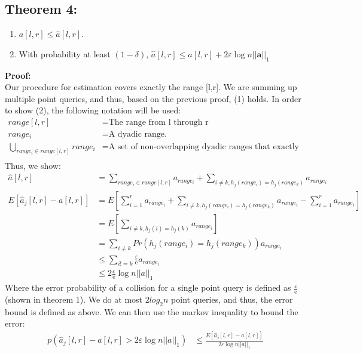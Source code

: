 \documentclass[11pt]{article}
\begin{document}
{\subsection{Theorem 4: }
\begin{enumerate}[label=\textnormal{(\arabic*)}]
    \item $a[l,r] \leq \hat a[l,r]$.\\
    \item With probability at least $(1-\delta)$, $\hat a[l,r] \leq a[l,r] + 2\varepsilon \log n ||\bm{a}||_1$
\end{enumerate}
    \textbf{Proof:}\\
Our procedure for estimation covers exactly the range [l,r]. We are summing up multiple point queries, and thus, based on the previous proof, (1) holds. In order to show (2), the following notation will be used:
\begin{align*}
    range[l,r] &= \text{The range from l through r}\\
    range_i &= \text{A dyadic range.}\\
    \bigcup_{range_i \in range[l,r]} range_i &= \text{A set of non-overlapping dyadic ranges that exactly cover range[l,r]}\\
\end{align*}
Thus, we show:
\begin{align*}
    \hat a[l,r] &= \sum_{range_i \in range[l,r]} a_{range_i} + \sum_{i \neq k, h_j(range_i) = h_j(range_k)} a_{range_i}\\
    E[\hat a_j[l,r] - a[l,r]] &= E[\sum_{i=1}^r a_{range_i} + \sum_{i \neq k, h_j(range_i)=h_j(range_k)} a_{range_i} - \sum_{i=1}^r a_{range_i}]\\
    &= E[\sum_{i \neq k, h_j(i)=h_j(k)} a_{range_i}]\\
    &= \sum_{i \neq k}Pr(h_j(range_i) = h_j(range_k)) a_{range_i}\\
    &\leq \sum_{i!=k} \frac{\varepsilon}{\mathrm e} a_{range_i}\\
    &\leq 2\frac{\varepsilon}{\mathrm e} \log n ||a||_1
\end{align*}
Where the error probability of a collision for a single point query is defined as $\frac{\varepsilon}{\mathrm e}$ (shown in theorem 1). We do at most $2log_2n$ point queries, and thus, the error bound is defined as above. We can then use the markov inequality to bound the error:
\begin{align*}
    p(\hat a_j[l,r] - a[l,r] > 2\varepsilon \log n ||a||_1) &\leq \frac{E[\hat a_j[l,r] - a[l,r]]}{2\varepsilon \log n||a||_1}\\

\end{align*}}
\end{document}
